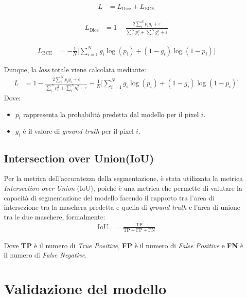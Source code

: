 \begin{align}
	L & = L_{\text{Dice}} + L_{\text{BCE}}
	\label{eq:dice_bce_loss}
\end{align}

\begin{align}
	L_{\text{Dice}} & = 1 - \frac{2\sum_i^N p_i g_i + \varepsilon}{\sum_i^N p_i^2 + \sum_i^N g_i^2 + \varepsilon}
	\label{eq:dice_loss}
\end{align}

\begin{align}
	L_{\text{BCE}} & = -\frac{1}{N} \Bigg[ \sum_{i=1}^N g_i \log(p_i) + (1 - g_i) \log(1 - p_i) \Bigg]
	\label{eq:bce_loss}
\end{align}

Dunque, la \textit{loss} totale viene calcolata mediante:
\begin{align}
	L & = 1 - \frac{2\sum_i^N p_i g_i + \varepsilon}{\sum_i^N p_i^2 + \sum_i^N g_i^2 + \varepsilon} -\frac{1}{N} \Bigg[ \sum_{i=1}^N g_i \log(p_i) + (1 - g_i) \log(1 - p_i) \Bigg]
	\label{eq:dice_bce_loss_complete}
\end{align}
Dove:
\begin{itemize}
	\item $p_i$ rappresenta la probabilità predetta dal modello per il pixel $i$.
	\item $g_i$ è il valore di \textit{ground truth} per il pixel $i$.
\end{itemize}

\subsection{Intersection over Union(IoU)}
Per la metrica dell'accuratezza della segmentazione, è stata utilizzata la metrica \textit{Intersection over Union} (IoU),
poiché è una metrica che permette di valutare la capacità di segmentazione del modello
facendo il rapporto tra l'area di intersezione tra la maschera predetta e quella di \textit{ground truth} e l'area di unione tra le due maschere, formalmente:
\begin{align}
	\text{IoU} & = \frac{\text{TP}}{\text{TP} + \text{FP} + \text{FN}}
	\label{eq:iou}
\end{align}

Dove \textbf{TP} è il numero di \textit{True Positive}, \textbf{FP} è il numero
di \textit{False Positive} e \textbf{FN} è il numero di \textit{False
	Negative}.

\section{Validazione del modello}

